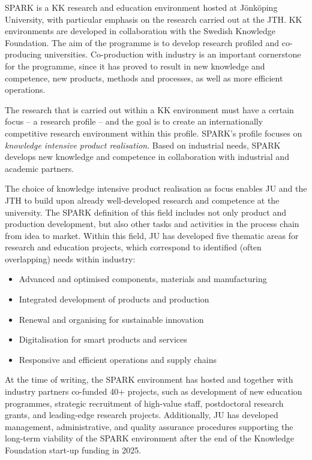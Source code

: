 \documentclass[11pt, a4paper]{resources/JTH}
\begin{document}
SPARK is a KK research and education environment hosted at Jönköping University, with particular emphasis on the research carried out at the JTH. KK environments are developed in collaboration with the Swedish Knowledge Foundation. The aim of the programme is to develop research profiled and co-producing universities. Co-production with industry is an important cornerstone for the programme, since it has proved to result in new knowledge and competence, new products, methods and processes, as well as more efficient operations.

The research that is carried out within a KK environment must have a certain focus – a research profile – and the goal is to create an internationally competitive research environment within this profile. SPARK's profile focuses on \textit{knowledge intensive product realisation}. Based on industrial needs, SPARK develops new knowledge and competence in collaboration with industrial and academic partners.

The choice of knowledge intensive product realisation as focus enables JU and the JTH to build upon already well-developed research and competence at the university. The SPARK definition of this field includes not only product and production development, but also other tasks and activities in the process chain from idea to market. Within this field, JU has developed five thematic areas for research and education projects, which correspond to identified (often overlapping) needs within industry:

\begin{itemize}
    \item Advanced and optimised components, materials and manufacturing
    \item Integrated development of products and production
    \item Renewal and organising for sustainable innovation
    \item Digitalisation for smart products and services
    \item Responsive and efficient operations and supply chains
\end{itemize}

At the time of writing, the SPARK environment has hosted and together with industry partners co-funded 40+ projects, such as development of new education programmes, strategic recruitment of high-value staff, postdoctoral research grants, and leading-edge research projects. Additionally, JU has developed management, administrative, and quality assurance procedures supporting the long-term viability of the SPARK environment after the end of the Knowledge Foundation start-up funding in 2025.
\end{document}
